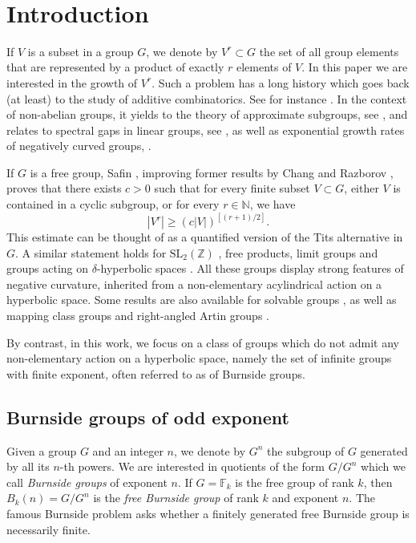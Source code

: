 \documentclass[JEP,XML,SOM,Unicode, NoEqCountersInSection,published]{cedram}
\theoremstyle{plain}
\theoremstyle{definition}
\begin{document}
\vspace*{-4\baselineskip}
\mbox{ }
\section{Introduction}
If $V$ is a subset in a group $G$, we denote by $V^r\subset G$ the set of all group elements that are represented by a product of exactly $r$ elements of $V$.
In this paper we are interested in the growth of $V^r$.
Such a problem has a long history which goes back (at least) to the study of additive combinatorics. See for instance \cite{nathanson_additive_1996, tao_additive_2006}.
In the context of non-abelian groups, it yields to the theory of approximate subgroups, see \cite{terence_product_2008,breuillard_structure_2012}, and relates to spectral gaps in linear groups, see
\cite{helfgott_growth_2008,bourgain_spectral_2008,bourgain_spectral_2012}, as well as exponential growth rates of negatively curved groups, \cite{koubi_croissance_1998,arzhantseva_lower_2006,breuillard_joint_2018,fujiwara_rates_2020}.

If $G$ is a free group, Safin \cite{safin_powers_2011}, improving former results by Chang \cite{chang_product_2008} and Razborov \cite{razborov_product_2014}, proves that there exists $c > 0$ such that for every finite subset $V \subset G$, either $V$ is contained in a cyclic subgroup, or for every $r \in \mathbb N$, we have
\begin{equation*}
|V^r| \geq (c |V|)^{[(r+1)/2]}.
\end{equation*}
This estimate can be thought of as a quantified version of the Tits alternative in $G$.
A similar statement holds for $\mathrm{SL}_2(\mathbb{Z})$ \cite{chang_product_2008}, free products, limit groups \cite{button_explicit_2013} and groups acting on $\delta$-hyperbolic spaces \cite{delzant_product_2020}. All these groups display strong features of negative curvature, inherited from a non-elementary acylindrical action on a hyperbolic space.
Some results are also available for solvable groups \cite{tao_freiman_2010,button_explicit_2013}, as well as mapping class groups and right-angled Artin groups \cite{kerr_product_2021}.

By contrast, in this work, we focus on a class of groups which do not admit any non-elementary action on a hyperbolic space, namely the set of infinite groups with finite exponent, often referred to as of Burnside groups.

\subsection{Burnside groups of odd exponent}
Given a group $G$ and an integer $n$, we denote by $G^n$ the subgroup of $G$ generated by all its $n$-th powers.
We are interested in quotients of the form $G/G^n$ which we call \emph{Burnside groups} of exponent $n$.
If $G = \mathbb F_k$ is the free group of rank $k$, then $B_k(n) = G/G^n$ is the \emph{free Burnside group} of rank $k$ and exponent $n$.
The famous Burnside problem asks whether a finitely generated free Burnside group is necessarily finite.
\end{document}
